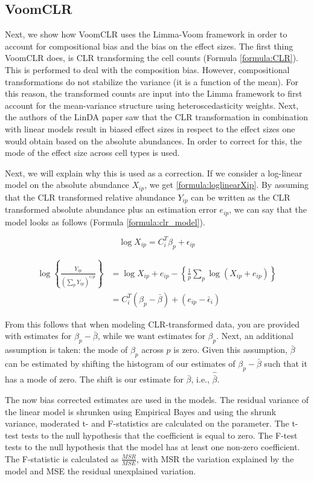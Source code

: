 \subsection{VoomCLR}
Next, we show how VoomCLR uses the Limma-Voom framework in order to account for compositional bias and the bias on the effect sizes.
The first thing VoomCLR does, is CLR transforming the cell counts (Formula \ref{formula:CLR}).
This is performed to deal with the composition bias.
However, compositional transformations do not stabilize the variance (it is a function of the mean).
For this reason, the transformed counts are input into the Limma framework to first account for the mean-variance structure using heteroscedasticity weights.
Next, the authors of the LinDA paper saw that the CLR transformation in combination with linear models result in biased effect sizes in respect to the effect sizes one would obtain based on the absolute abundances.
In order to correct for this, the mode of the effect size across cell types is used.

Next, we will explain why this is used as a correction.
If we consider a log-linear model on the absolute abundance $X_{ip}$, we get \ref{formula:loglinearXip}.
By assuming that the CLR transformed relative abundance $Y_{ip}$ can be written as the CLR transformed absolute abundance plus an estimation error $e_{ip}$, we can say that the model looks as follows (Formula \ref{formula:clr_model}).

\begin{equation}
    \log X_{ip} = C_i^T \beta_p + \epsilon_{ip}
    \label{formula:loglinearXip}
\end{equation}

\begin{align}
    \log \left\{\frac{Y_{ip}}{\left(\sum_p Y_{ip}\right)^{i/p}}\right\} &= \log X_{ip} + e_{ip} - \left\{\frac{1}{p} \sum_p \log (X_{ip} + e_{ip})\right\} \\
        &= C_i^T (\beta_p - \bar{\beta}) + (e_{ip} - \bar{\epsilon}_i)
    \label{formula:clr_model}
\end{align}

From this follows that when modeling CLR-transformed data, you are provided with estimates for $\beta_p - \bar{\beta}$, while we want estimates for $\beta_p$.
Next, an additional assumption is taken: the mode of $\beta_p$ across $p$ is zero.
Given this assumption, $\bar{\beta}$ can be estimated by shifting the histogram of our estimates of $\beta_p - \bar{\beta}$ such that it has a mode of zero.
The shift is our estimate for $\bar{\beta}$, i.e., $\hat{\bar{\beta}}$.

The now bias corrected estimates are used in the models.
The residual variance of the linear model is shrunken using Empirical Bayes and using the shrunk variance, moderated t- and F-statistics are calculated on the parameter.
The t-test tests to the null hypothesis that the coefficient is equal to zero.
The F-test tests to the null hypothesis that the model has at least one non-zero coefficient.
The F-statistic is calculated as $\frac{MSR}{MSE}$, with MSR the variation explained by the model and MSE the residual unexplained variation.
